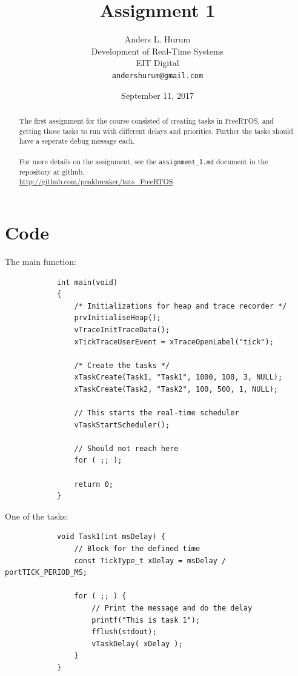 \documentclass[12pt,fleqn,leqno,letterpaper]{article}
\title{Assignment 1}
\author{Anders L. Hurum\\
    \small{Development of Real-Time Systems}\\
    \small{EIT Digital}\\
    \small{\texttt{andershurum@gmail.com}}
}
\date{September 11, 2017}
\begin{document}
    \maketitle

    \begin{abstract}
        
        The first assignment for the course consisted of creating tasks in FreeRTOS, 
        and getting those tasks to run with different delays and priorities.  
        Further the tasks should have a seperate debug message each. \\ \\
        For more details on the assignment, see the \texttt{assignment\_1.md} document 
        in the repository at github. \\
        
        \url{http://github.com/peakbreaker/tuts\_FreeRTOS}

    \end{abstract}

    \newpage

    \section*{Code}

        The main function:

        \begin{verbatim}
            int main(void)
            {
                /* Initializations for heap and trace recorder */
                prvInitialiseHeap();    
                vTraceInitTraceData();
                xTickTraceUserEvent = xTraceOpenLabel("tick");
            
                /* Create the tasks */
                xTaskCreate(Task1, "Task1", 1000, 100, 3, NULL);
                xTaskCreate(Task2, "Task2", 100, 500, 1, NULL);
                
                // This starts the real-time scheduler
                vTaskStartScheduler();
                
                // Should not reach here
                for ( ;; );
                
                return 0;
            }
        \end{verbatim}

        One of the tasks:

        \begin{verbatim}
            void Task1(int msDelay) {
                // Block for the defined time
                const TickType_t xDelay = msDelay / portTICK_PERIOD_MS;
            
                for ( ;; ) {
                    // Print the message and do the delay
                    printf("This is task 1");
                    fflush(stdout);
                    vTaskDelay( xDelay );
                }
            }
        \end{verbatim}
\end{document}
